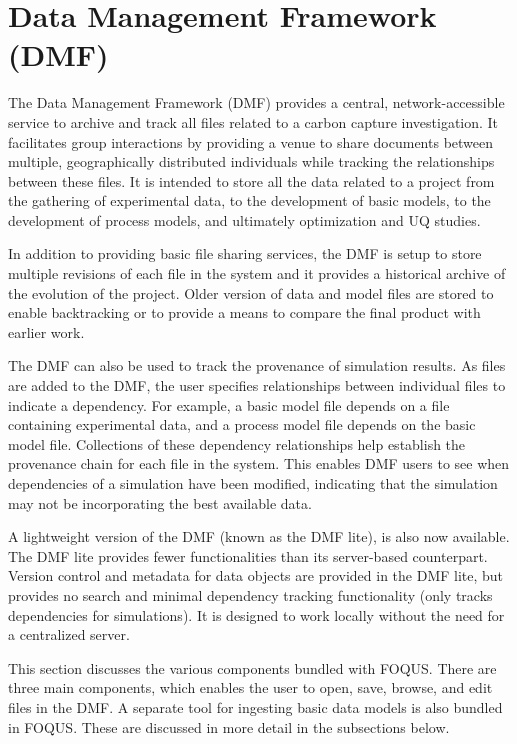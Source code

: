 \section{Data Management Framework (DMF)}
\label{sec.dmf}
The Data Management Framework (DMF) provides a central,
network-accessible service to archive and track all files related to a
carbon capture investigation. It facilitates group interactions by
providing a venue to share documents between multiple, geographically
distributed individuals while tracking the relationships between these
files. It is intended to store all the data related to a project from
the gathering of experimental data, to the development of basic
models, to the development of process models, and ultimately
optimization and UQ studies.

In addition to providing basic file sharing services, the DMF is setup
to store multiple revisions of each file in the system and it
provides a historical archive of the evolution of the project. Older
version of data and model files are stored to enable backtracking or
to provide a means to compare the final product with earlier work.

The DMF can also be used to track the provenance of simulation
results. As files are added to the DMF, the user specifies
relationships between individual files to indicate a dependency. For
example, a basic model file depends on a file containing experimental
data, and a process model file depends on the basic model
file. Collections of these dependency relationships help establish
the provenance chain for each file in the system. This enables DMF
users to see when dependencies of a simulation
have been modified, indicating that the simulation may not be
incorporating the best available data.

A lightweight version of the DMF (known as the DMF lite), is also now available.
The DMF lite provides fewer functionalities than its server-based counterpart.
Version control and metadata for data objects are provided in the DMF lite,
but provides no search and minimal dependency tracking functionality (only tracks
dependencies for simulations). It is designed to work locally without the
need for a centralized server.

This section discusses the various components bundled with FOQUS.
There are three main components, which enables the user to open,
save, browse, and edit files in the DMF. A separate tool for
ingesting basic data models is also bundled in FOQUS. These are discussed in
more detail in the subsections below.

